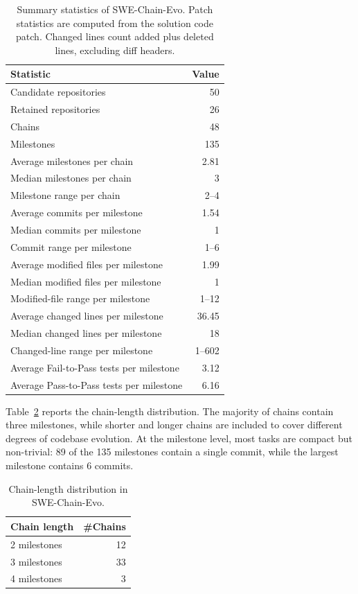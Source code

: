 \documentclass{llmxive}
\begin{document}
\begin{table}[t]
\centering
\small
\begin{tabular}{lr}
\toprule
Statistic & Value \\
\midrule
Candidate repositories & 50 \\
Retained repositories & 26 \\
Chains & 48 \\
Milestones & 135 \\
Average milestones per chain & 2.81 \\
Median milestones per chain & 3 \\
Milestone range per chain & 2--4 \\
Average commits per milestone & 1.54 \\
Median commits per milestone & 1 \\
Commit range per milestone & 1--6 \\
Average modified files per milestone & 1.99 \\
Median modified files per milestone & 1 \\
Modified-file range per milestone & 1--12 \\
Average changed lines per milestone & 36.45 \\
Median changed lines per milestone & 18 \\
Changed-line range per milestone & 1--602 \\
Average Fail-to-Pass tests per milestone & 3.12 \\
Average Pass-to-Pass tests per milestone & 6.16 \\
\bottomrule
\end{tabular}
\caption{Summary statistics of SWE-Chain-Evo. Patch statistics are computed from the solution code patch. Changed lines count added plus deleted lines, excluding diff headers.}
\label{tab:swe_chain_overall_stats}
\end{table}

Table~\ref{tab:swe_chain_length_stats} reports the chain-length distribution. The majority of chains contain three milestones, while shorter and longer chains are included to cover different degrees of codebase evolution. At the milestone level, most tasks are compact but non-trivial: 89 of the 135 milestones contain a single commit, while the largest milestone contains 6 commits.

\begin{table}[t]
\centering
\small
\begin{tabular}{lr}
\toprule
Chain length & \#Chains \\
\midrule
2 milestones & 12 \\
3 milestones & 33 \\
4 milestones & 3 \\
\bottomrule
\end{tabular}
\caption{Chain-length distribution in SWE-Chain-Evo.}
\label{tab:swe_chain_length_stats}
\end{table}
\end{document}
